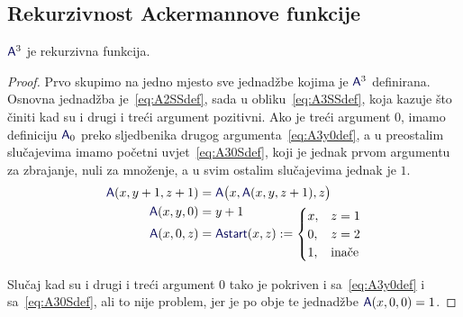 \subsection{Rekurzivnost Ackermannove funkcije}

\begin{propozicija}[{name=[rekurzivnost Ackermannove funkcije]}]
    $\f A^3$ je rekurzivna funkcija.
\end{propozicija}
\begin{proof}
Prvo skupimo na jedno mjesto sve jednadžbe kojima je $\f A^3$ definirana. Osnovna jednadžba je~\eqref{eq:A2SSdef}, sada u obliku~\eqref{eq:A3SSdef}, koja kazuje što činiti kad su i drugi i treći argument pozitivni. Ako je treći argument $0$, imamo definiciju $\f A_0$ preko sljedbenika drugog argumenta~\eqref{eq:A3y0def}, a u preostalim slučajevima imamo početni uvjet~\eqref{eq:A30Sdef}, koji je jednak prvom argumentu za zbrajanje, nuli za množenje, a u svim ostalim slučajevima jednak je $1$.
\begin{align}
\label{eq:A3SSdef}
    \f A(x,y+1,z+1)&=\f A\bigl(x,\f A(x,y,z+1),z\bigr)\\
\label{eq:A3y0def}
    \f A(x,y,0)&=y+1\\[-5mm]
\label{eq:A30Sdef}
    \f A(x,0,z)&=\f{Astart}(x,z):=\begin{cases}
        x,&z=1\\
        0,&z=2\\
        1,&\text{inače}
    \end{cases}
\end{align}

Slučaj kad su i drugi i treći argument $0$ tako je pokriven i sa~\eqref{eq:A3y0def} i sa~\eqref{eq:A30Sdef}, ali to nije problem, jer je po obje te jednadžbe $\f A(x,0,0)=1$.


\end{proof}
